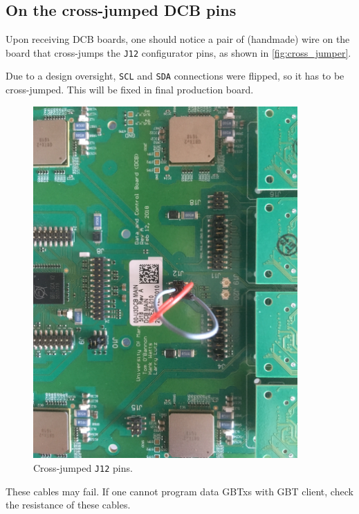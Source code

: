 \subsection{On the cross-jumped DCB pins}
\label{sec:cross_jumper}
Upon receiving DCB boards, one should notice a pair of (handmade) wire on the
board that cross-jumps the \texttt{J12} configurator pins, as shown in
\autoref{fig:cross_jumper}.

Due to a design oversight, \texttt{SCL} and \texttt{SDA} connections were
flipped, so it has to be cross-jumped.
This will be fixed in final production board.

\begin{figure}[ht]
    \centering
    \includegraphics[width=0.9\textwidth]{res/cross_jumper.jpg}
    \caption{Cross-jumped \texttt{J12} pins.}
    \label{fig:cross_jumper}
\end{figure}

\begin{leftbar}
    These cables may fail.
    If one cannot program data GBTxs with GBT client, check the resistance of
    these cables.
\end{leftbar}
